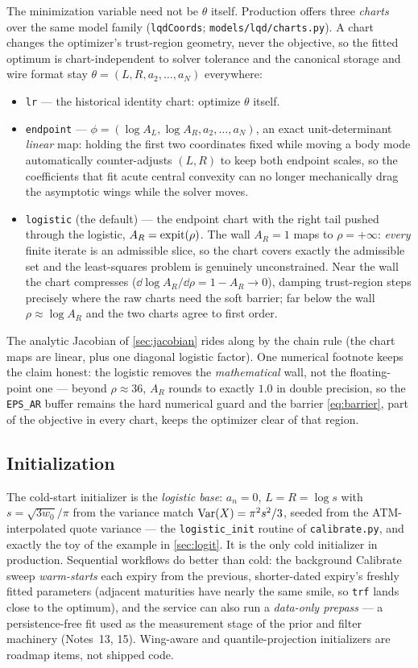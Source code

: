 \documentclass[11pt]{article}
\begin{document}
The minimization variable need not be $\theta$ itself. Production offers
three \emph{charts} over the same model family
(\texttt{lqdCoords}; \texttt{models/lqd/charts.py}). A chart changes the
optimizer's trust-region geometry, never the objective, so the fitted optimum
is chart-independent to solver tolerance and the canonical storage and wire
format stay $\theta=(L,R,a_2,\dots,a_N)$ everywhere:
\begin{itemize}[leftmargin=1.4em]
\item \texttt{lr} --- the historical identity chart: optimize $\theta$
itself.
\item \texttt{endpoint} --- $\phi=(\log A_L,\log A_R,a_2,\dots,a_N)$, an
exact unit-determinant \emph{linear} map: holding the first two coordinates
fixed while moving a body mode automatically counter-adjusts $(L,R)$ to keep
both endpoint scales, so the coefficients that fit acute central convexity
can no longer mechanically drag the asymptotic wings while the solver moves.
\item \texttt{logistic} (the default) --- the endpoint chart with the right
tail pushed through the logistic, $A_R=\operatorname{expit}(\rho)$. The wall $A_R=1$ maps
to $\rho=+\infty$: \emph{every} finite iterate is an admissible slice, so
the chart covers exactly the admissible set and the least-squares problem is
genuinely unconstrained. Near the wall the chart compresses
($\dd\log A_R/\dd\rho=1-A_R\to0$), damping trust-region steps precisely
where the raw charts need the soft barrier; far below the wall
$\rho\approx\log A_R$ and the two charts agree to first order.
\end{itemize}
The analytic Jacobian of \cref{sec:jacobian} rides along by the chain rule
(the chart maps are linear, plus one diagonal logistic factor). One numerical
footnote keeps the claim honest: the logistic removes the \emph{mathematical}
wall, not the floating-point one --- beyond $\rho\approx36$, $A_R$ rounds to
exactly $1.0$ in double precision, so the \texttt{EPS\_AR} buffer remains the
hard numerical guard and the barrier \eqref{eq:barrier}, part of the
objective in every chart, keeps the optimizer clear of that region.

\subsection{Initialization}

The cold-start initializer is the \emph{logistic base}: $a_n=0$, $L=R=\log s$
with $s=\sqrt{3w_0}/\pi$ from the variance match $\operatorname{Var}(X)=\pi^2s^2/3$, seeded
from the ATM-interpolated quote variance --- the \texttt{logistic\_init}
routine of \texttt{calibrate.py}, and exactly the toy of the example in
\cref{sec:logit}. It is the only cold initializer in production. Sequential
workflows do better than cold: the background Calibrate sweep \emph{warm-starts}
each expiry from the previous, shorter-dated expiry's freshly fitted
parameters (adjacent maturities have nearly the same smile, so \texttt{trf}
lands close to the optimum), and the service can also run a \emph{data-only
prepass} --- a persistence-free fit used as the measurement stage of the prior
and filter machinery (Notes~13, 15). Wing-aware and quantile-projection
initializers are roadmap items, not shipped code.
\end{document}
